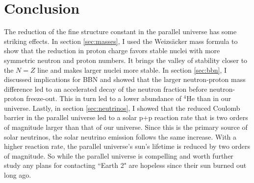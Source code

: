 \documentclass[%
 reprint,
 amsmath,amssymb,
 aps,
]{revtex4-1}
\begin{document}
\section{\label{sec:conclusion}Conclusion}

The reduction of the fine structure constant in the parallel universe has some striking effects. In section \ref{sec:masses}, I used the Weizs\"acker mass formula to show that the reduction in proton charge favors stable nuclei with more symmetric neutron and proton numbers. It brings the valley of stability closer to the $N = Z$ line and makes larger nuclei more stable. In section \ref{sec:bbn}, I discussed implications for BBN and showed that the larger neutron-proton mass difference led to an accelerated decay of the neutron fraction before neutron-proton freeze-out. This in turn led to a lower abundance of ${}^4\text{He}$ than in our universe. Lastly, in section \ref{sec:neutrinos}, I showed that the reduced Coulomb barrier in the parallel universe led to a solar p+p reaction rate that is two orders of magnitude larger than that of our universe. Since this is the primary source of solar neutrinos, the solar neutrino emission follows the same increase. With a higher reaction rate, the parallel universe's sun's lifetime is reduced by two orders of magnitude. So while the parallel universe is compelling and worth further study any plans for contacting ``Earth 2" are hopeless since their sun burned out long ago.


 
\end{document}
